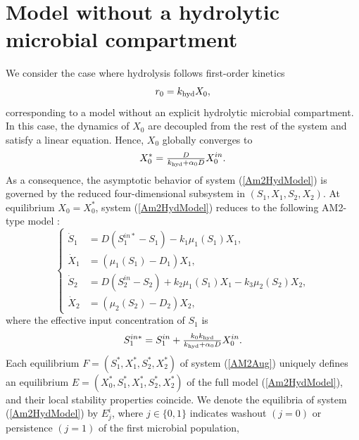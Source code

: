 \documentclass[runningheads]{llncs}
\begin{document}
\section{Model without a hydrolytic microbial compartment}   \label{SecNoComp}
We consider the case where hydrolysis follows first-order kinetics
\[
r_0 = k_{\rm hyd} X_0,
\]
corresponding to a model without an explicit hydrolytic microbial compartment. 
In this case, the dynamics of $X_0$ are decoupled from the rest of the system and satisfy a linear equation. Hence, $X_0$ globally converges to
\begin{equation}     \label{ExpX0*}
X_0^* = \tfrac{D}{k_{\rm hyd}+\alpha_0 D} X_0^{in}.
\end{equation}
As a consequence, the asymptotic behavior of system (\ref{Am2HydModel}) is governed by the reduced four-dimensional subsystem in $(S_1,X_1,S_2,X_2)$.
At equilibrium $X_0 = X_0^*$, system (\ref{Am2HydModel}) reduces to the following AM2-type model \cite{BenyahiaJPC2012,SariNonLinDyn2021}:
\begin{equation}                \label{AM2Aug}
\left\{
\begin{aligned}
\dot{S}_1 &= D(S_1^{in*}-S_1) - k_1 \mu_1(S_1) X_1,\\
\dot{X}_1 &= (\mu_1(S_1) - D_1) X_1,\\
\dot{S}_2 &= D(S_2^{in}-S_2) + k_2 \mu_1(S_1) X_1 - k_3 \mu_2(S_2) X_2,\\
\dot{X}_2 &= (\mu_2(S_2) - D_2) X_2,
\end{aligned}
\right.
\end{equation}
where the effective input concentration of $S_1$ is
\begin{equation}     \label{ExpS1in*}
S_1^{in*} = S_1^{in} + \tfrac{k_0 k_{\rm hyd}}{k_{\rm hyd}+\alpha_0 D} X_0^{in}.
\end{equation}
Each equilibrium $F=(S_1^*,X_1^*,S_2^*,X_2^*)$ of system (\ref{AM2Aug}) uniquely defines an equilibrium 
$E=(X_0^*,S_1^*,X_1^*,S_2^*,X_2^*)$ of the full model (\ref{Am2HydModel}), and their local stability properties coincide. 
We denote the equilibria of system (\ref{Am2HydModel}) by $E_j^i$, where 
$j\in\{0,1\}$ indicates washout $(j=0)$ or persistence $(j=1)$ of the first microbial population, 
\end{document}
